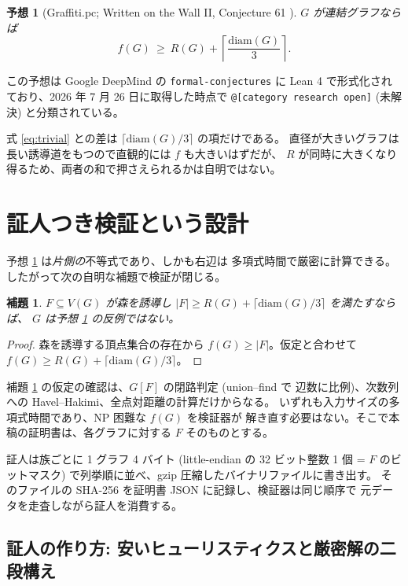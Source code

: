 \documentclass[paper=a4,fontsize=10.5pt,jafontsize=10.5pt]{jlreq}
\theoremstyle{plain}
\newtheorem{lemma}[theorem]{補題}
\newtheorem{conjecture}[theorem]{予想}
\theoremstyle{definition}
\begin{document}
\begin{conjecture}[Graffiti.pc; Written on the Wall II, Conjecture 61 \cite{wowii}]
\label{conj:main}
$G$ が連結グラフならば
\[ f(G) \ \ge \ R(G) + \left\lceil \frac{\mathrm{diam}(G)}{3} \right\rceil . \]
\end{conjecture}

この予想は Google DeepMind の \texttt{formal-conjectures} \cite{formalconj} に
Lean 4 で形式化されており、2026 年 7 月 26 日に取得した時点で
\texttt{@[category research open]} (未解決) と分類されている。

式 \eqref{eq:trivial} との差は $\lceil \mathrm{diam}(G)/3 \rceil$ の項だけである。
直径が大きいグラフは長い誘導道をもつので直観的には $f$ も大きいはずだが、
$R$ が同時に大きくなり得るため、両者の和で押さえられるかは自明ではない。

\section{証人つき検証という設計}\label{sec:design}

予想 \ref{conj:main} は\emph{片側の}不等式であり、しかも右辺は
多項式時間で厳密に計算できる。したがって次の自明な補題で検証が閉じる。

\begin{lemma}\label{lem:witness}
$F \subseteq V(G)$ が森を誘導し
$|F| \ge R(G) + \lceil \mathrm{diam}(G)/3 \rceil$ を満たすならば、
$G$ は予想 \ref{conj:main} の反例ではない。
\end{lemma}

\begin{proof}
森を誘導する頂点集合の存在から $f(G) \ge |F|$。仮定と合わせて
$f(G) \ge R(G) + \lceil \mathrm{diam}(G)/3 \rceil$。
\end{proof}

補題 \ref{lem:witness} の仮定の確認は、$G[F]$ の閉路判定 (union--find で
辺数に比例)、次数列への Havel--Hakimi、全点対距離の計算だけからなる。
いずれも入力サイズの多項式時間であり、NP 困難な $f(G)$ を検証器が
解き直す必要はない。そこで本稿の証明書は、各グラフに対する $F$ そのものとする。

証人は族ごとに 1 グラフ 4 バイト (little-endian の 32 ビット整数 1 個 =
$F$ のビットマスク) で列挙順に並べ、gzip 圧縮したバイナリファイルに書き出す。
そのファイルの SHA-256 を証明書 JSON に記録し、検証器は同じ順序で
元データを走査しながら証人を消費する。

\subsection{証人の作り方: 安いヒューリスティクスと厳密解の二段構え}
\end{document}
